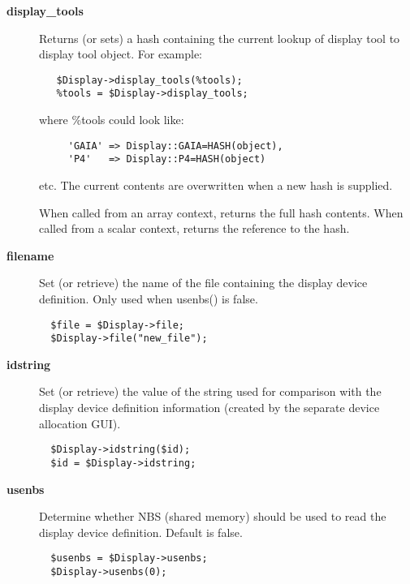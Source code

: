 \begin{description}
\begin{description}
\item[{\textbf{display\_tools}}] \mbox{}

Returns (or sets) a hash containing the current lookup of display tool
to display tool object. For example:

\begin{verbatim}
   $Display->display_tools(%tools);
   %tools = $Display->display_tools;
\end{verbatim}


where \%tools could look like:

\begin{verbatim}
     'GAIA' => Display::GAIA=HASH(object),
     'P4'   => Display::P4=HASH(object)
\end{verbatim}


etc. The current contents are overwritten when a new hash is supplied.



When called from an array context, returns the full hash contents.
When called from a scalar context, returns the reference to the hash.


\item[{\textbf{filename}}] \mbox{}

Set (or retrieve) the name of the file containing the display device
definition. Only used when usenbs() is false.

\begin{verbatim}
  $file = $Display->file;
  $Display->file("new_file");
\end{verbatim}

\item[{\textbf{idstring}}] \mbox{}

Set (or retrieve) the value of the string used for comparison
with the display device definition information (created by the
separate device allocation GUI).

\begin{verbatim}
  $Display->idstring($id);
  $id = $Display->idstring;
\end{verbatim}

\item[{\textbf{usenbs}}] \mbox{}

Determine whether NBS (shared memory) should be used to read the
display device definition. Default is false.

\begin{verbatim}
  $usenbs = $Display->usenbs;
  $Display->usenbs(0);
\end{verbatim}


\end{description}
\end{description}

